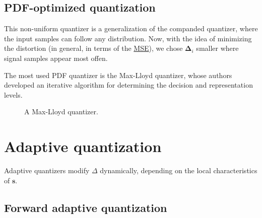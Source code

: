 
\subsection{PDF-optimized quantization}

This non-uniform quantizer is a generalization of the companded
quantizer, where the input samples can follow any distribution. Now,
with the idea of minimizing the distortion (in general, in terms of
the \href{https://en.wikipedia.org/wiki/Mean_squared_error}{MSE}), we
chose ${\mathbf\Delta}_i$ smaller where signal samples appear most
offen.

The most used PDF quantizer is the Max-Lloyd quantizer, whose authors
developed an iterative algorithm for determining the decision and
representation levels.

\begin{figure}
  \centering
  \caption{A Max-Lloyd quantizer.}
  \label{fig:Max-Lloyd}
\end{figure}


\section{Adaptive quantization}

Adaptive quantizers modify $\Delta$ dynamically, depending on the local
characteristics of ${\mathbf s}$.


\subsection{Forward adaptive quantization}

